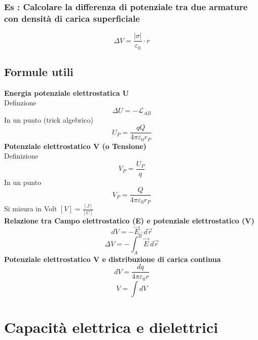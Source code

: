 \documentclass[twoside]{article}
\begin{document}
\subsubsection{Es : Calcolare la differenza di potenziale tra due armature con densità di carica superficiale}
\begin{equation}
    \boxed{\Delta V = \displaystyle \frac{|\sigma|}{\varepsilon_0} \cdot r}
\end{equation}
\newpage
\subsection{Formule utili}
\noindent
\textbf{Energia potenziale elettrostatica U}\\
Definzione
\begin{equation}
    \boxed{\Delta U = -\mathcal{L}_{AB}}
\end{equation}
In un punto (trick algebrico)
\begin{equation}
    \boxed{U_P = \displaystyle \frac{qQ}{4\pi \varepsilon_0 r_{P}}}
\end{equation}
\textbf{Potenziale elettrostatico V (o Tensione)}\\
\noindent
Definizione
\begin{equation}
    \boxed{V_P = \frac{U_P}{q}}
\end{equation}
In un punto
\begin{equation}
    \boxed{V_P = \displaystyle \frac{Q}{4\pi \varepsilon_0 r_P}}
\end{equation}
Si misura in Volt \(\left[V\right] = \frac{\left[J\right]}{\left[C\right]}\)\\
\noindent
\textbf{Relazione tra Campo elettrostatico (E) e potenziale elettrostatico (V)}
\begin{equation}
    \boxed{dV = -\vec{E} \cdot d\vec{r}}
\end{equation}
\begin{equation}
    \boxed{\Delta V = - \int_{A}^{B}\vec{E}\ d\vec{r}}
\end{equation}
\textbf{Potenziale elettrostatico V e distribuzione di carica continua}
\begin{equation}
    \boxed{dV = \displaystyle \frac{ dq }{4\pi \varepsilon_0 r}}
\end{equation}
\begin{equation}
    \boxed{V = \displaystyle \int dV}
\end{equation}

\newpage
\section{Capacità elettrica e dielettrici}
\end{document}
